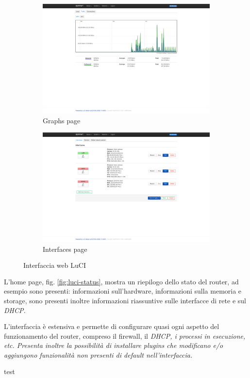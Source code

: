 \begin{figure}[H]
    \begin{subfigure}{0.5\linewidth}
        \centering
        \includegraphics[height=0.65\linewidth]{immagini/LuCI_graphs}
        \caption{Graphs page}
        \label{fig:luci-graphs}
    \end{subfigure}%
    \hfill
    \begin{subfigure}{0.5\linewidth}
        \centering
        \includegraphics[height=0.65\linewidth]{immagini/LuCI_interfaces}
        \caption{Interfaces page}
        \label{fig:luci-interfaces}
    \end{subfigure}%
    \caption{Interfaccia web LuCI}
\end{figure}


L'home page, fig. \ref{fig:luci-status}, mostra un riepilogo dello stato del router, ad esempio sono presenti: informazioni sull'hardware, informazioni sulla memoria e storage, sono presenti inoltre informazioni riassuntive sulle interfacce di rete e sul \it{DHCP}.

L'interfaccia è estensiva e permette di configurare quasi ogni aspetto del funzionamento del router, compreso il firewall, il \it{DHCP}, i processi in esecuzione, etc. Presenta inoltre la possibilità di installare plugins che modificano e/o aggiungono funzionalità non presenti di default nell'interfaccia.

test